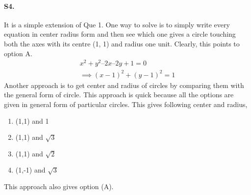 \documentclass{article}
\begin{document}
\paragraph{S4.} It is a simple extension of Que 1. One way to solve is to simply write every equation in center radius form and then see which one gives a circle touching both the axes with its centre (1, 1) and
radius one unit. Clearly, this points to option A.
\begin{align*}
    x^2 + y^2 – 2x – 2y + 1= 0 \\
    \implies (x-1)^2+(y-1)^2=1
\end{align*}
Another approach is to get center and radius of circles by comparing them with the general form of circle. This approach is quick because all the options are given in general form of particular circles. This gives following center and radius,
\begin{enumerate}
    \item (1,1) and 1
    \item (1,1) and $\sqrt{3}$
    \item (1,1) and $\sqrt{2}$
    \item (1,-1) and $\sqrt{3}$ 
\end{enumerate}
This approach also gives option (A).
\clearpage
\end{document}
